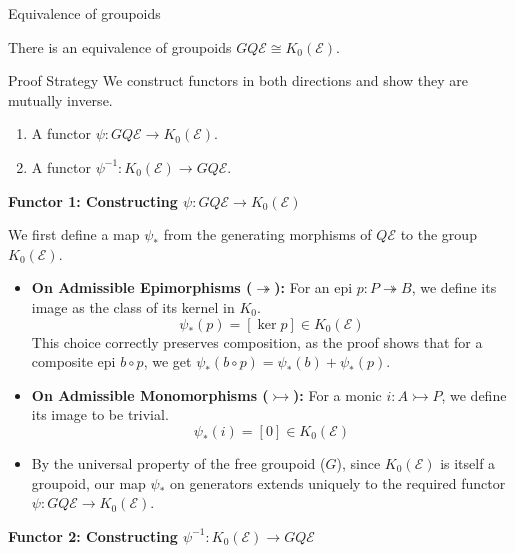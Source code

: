 \documentclass[10pt]{beamer}
\begin{document}
\begin{frame}{Equivalence of groupoids}
	\begin{theorem}
		There is an equivalence of groupoids $GQ\mathcal{E} \cong K_0(\mathcal{E})$.
	\end{theorem}	
	\framebreak
	
	\begin{alertblock}{Proof Strategy}
		We construct functors in both directions and show they are mutually inverse.
		\begin{enumerate}
			\item A functor $\psi: GQ\mathcal{E} \to K_0(\mathcal{E})$.
			\item A functor $\psi^{-1}: K_0(\mathcal{E}) \to GQ\mathcal{E}$.
		\end{enumerate}
	\end{alertblock}
	
	
	
	\textbf{Functor 1: Constructing $\psi: GQ\mathcal{E} \to K_0(\mathcal{E})$}
	
	We first define a map $\psi_*$ from the generating morphisms of $Q\mathcal{E}$ to the group $K_0(\mathcal{E})$.
	
	\begin{itemize}
		\item \textbf{On Admissible Epimorphisms ($\twoheadrightarrow$):} For an epi $p: P \twoheadrightarrow B$, we define its image as the class of its kernel in $K_0$.
		\[ \psi_*(p) = [\ker p] \in K_0(\mathcal{E}) \]
		This choice correctly preserves composition, as the proof shows that for a composite epi $b \circ p$, we get $\psi_*(b \circ p) = \psi_*(b) + \psi_*(p)$.
		
		
		
		\item \textbf{On Admissible Monomorphisms ($\rightarrowtail$):} For a monic $i: A \rightarrowtail P$, we define its image to be trivial.
		\[ \psi_*(i) = [0] \in K_0(\mathcal{E}) \]
		
		\item By the universal property of the free groupoid ($G$), since $K_0(\mathcal{E})$ is itself a groupoid, our map $\psi_*$ on generators extends uniquely to the required functor $\psi: GQ\mathcal{E} \to K_0(\mathcal{E})$.
	\end{itemize}
	
	
	
	\textbf{Functor 2: Constructing $\psi^{-1}: K_0(\mathcal{E}) \to GQ\mathcal{E}$}
	

\end{frame}
\end{document}
